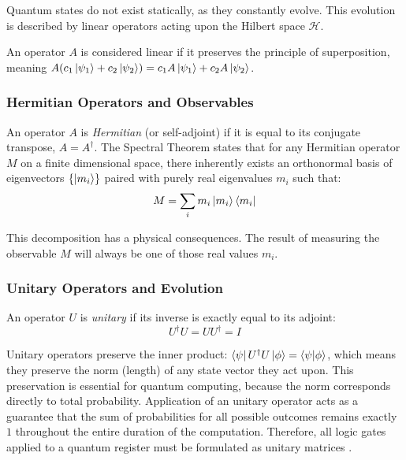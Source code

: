 Quantum states do not exist statically, as they constantly evolve.
This evolution is described by linear operators acting upon the Hilbert space $\mathcal{H}$.
%
%

An operator $A$ is considered linear if it preserves the principle of superposition, meaning 
%
%
$A(c_1\ket{\psi_1} + c_2\ket{\psi_2}) = c_1 A\ket{\psi_1} + c_2 A\ket{\psi_2}$.
%
%

\subsubsection{Hermitian Operators and Observables}

An operator $A$ is \textit{Hermitian} (or self-adjoint) if it is equal to its conjugate transpose, $A = A^\dagger$.
%
%
The Spectral Theorem states that for any Hermitian operator $M$ on a finite dimensional space, 
there inherently exists an orthonormal basis of eigenvectors $\{\ket{m_i}\}$ paired with 
purely real eigenvalues $m_i$ such that:
%
%
\bigskip
\begin{equation}
    M = \sum_i m_i \ket{m_i}\bra{m_i}
\end{equation}
\bigskip
%
%

This decomposition has a physical consequences. The result of measuring the observable $M$ will always be one of those real values $m_i$.
%
%
\subsubsection{Unitary Operators and Evolution}

An operator $U$ is \textit{unitary} if its inverse is exactly equal to its adjoint:
%
%
\bigskip
\begin{equation}
    U^\dagger U = U U^\dagger = I
\end{equation}
\bigskip
%
%

Unitary operators preserve the inner product: $\bra{\psi} U^\dagger U \ket{\phi} = \braket{\psi}{\phi}$, 
which means they preserve the norm (length) of any state vector they act upon.
%
%
This preservation is essential for quantum computing, because the norm corresponds directly to total probability.
%
%
Application of an unitary operator acts as a guarantee that the sum of probabilities for all possible outcomes remains exactly $1$ throughout the entire duration of the computation.
%
%
Therefore, all logic gates applied to a quantum register must be formulated as unitary matrices \cite{nielsen2010quantum}.